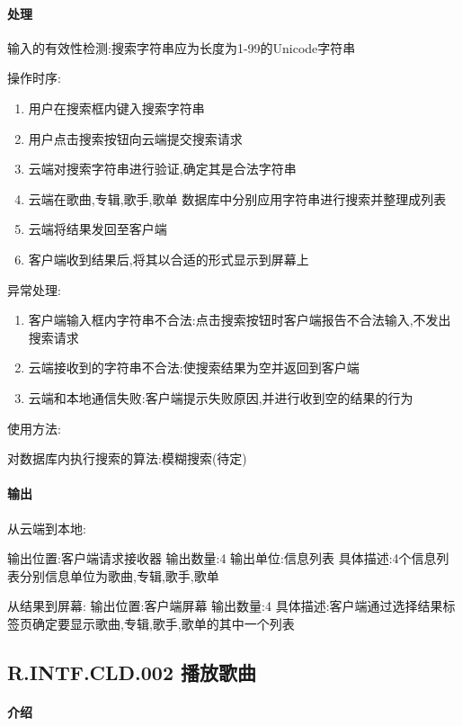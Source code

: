 \paragraph{处理}

输入的有效性检测:搜索字符串应为长度为1-99的Unicode字符串


操作时序:
\begin{enumerate}
	\item 用户在搜索框内键入搜索字符串
	\item 用户点击搜索按钮向云端提交搜索请求
	\item 云端对搜索字符串进行验证,确定其是合法字符串
	\item 云端在歌曲,专辑,歌手,歌单 数据库中分别应用字符串进行搜索并整理成列表
	\item 云端将结果发回至客户端
	\item 客户端收到结果后,将其以合适的形式显示到屏幕上
\end{enumerate}

异常处理:
\begin{enumerate}
	\item 客户端输入框内字符串不合法:点击搜索按钮时客户端报告不合法输入,不发出搜索请求
	\item 云端接收到的字符串不合法:使搜索结果为空并返回到客户端
	\item 云端和本地通信失败:客户端提示失败原因,并进行收到空的结果的行为
\end{enumerate}


使用方法:

对数据库内执行搜索的算法:模糊搜索(待定)




\paragraph{输出}

从云端到本地:

输出位置:客户端请求接收器
输出数量:4
输出单位:信息列表
具体描述:4个信息列表分别信息单位为歌曲,专辑,歌手,歌单

从结果到屏幕:
输出位置:客户端屏幕
输出数量:4
具体描述:客户端通过选择结果标签页确定要显示歌曲,专辑,歌手,歌单的其中一个列表

\subsection{R.INTF.CLD.002 播放歌曲}

\paragraph{介绍}

